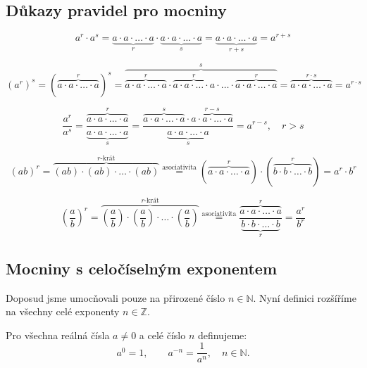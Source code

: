 \documentclass[12pt,a4paper]{article}
\begin{document}
\subsection*{Důkazy pravidel pro mocniny}

\[
a^r \cdot a^s = 
\underbrace{a \cdot a \cdot \ldots \cdot a}_{r}
\cdot
\underbrace{a \cdot a \cdot \ldots \cdot a}_{s}
=
\underbrace{a \cdot a \cdot \ldots \cdot a}_{r+s}
= a^{r+s}
\]

\[
(a^r)^s 
=
\left(\overbrace{a \cdot a \cdot \ldots \cdot a}^{r}\right)^s
=
\overbrace{\overbrace{a \cdot a \cdot \ldots \cdot a}^{r}
\cdot
\overbrace{a \cdot a \cdot \ldots \cdot a}^{r}
\cdot
\ldots
\cdot
\overbrace{a \cdot a \cdot \ldots \cdot a}^{r}}^{s}
= \overbrace{a \cdot a \cdot \ldots \cdot a}^{r \cdot s} = a^{r \cdot s}
\]

\[
\frac{a^r}{a^s} =
\frac{\overbrace{a \cdot a \cdot \ldots \cdot a}^{r}}
     {\underbrace{a \cdot a \cdot \ldots \cdot a}_{s}}
= 
\frac{\overbrace{a \cdot a \cdot \ldots \cdot a}^{s}
      \cdot \overbrace{a \cdot a \cdot \ldots \cdot a}^{r-s}}
     {\underbrace{a \cdot a \cdot \ldots \cdot a}_{s}}
= a^{r-s}, \quad r>s
\]

\[
(ab)^r = \overbrace{(ab)\cdot (ab)\cdot \ldots \cdot (ab)}^{r\text{-krát}}
\overset{\text{asociativita}}{=}
\left(\overbrace{a \cdot a \cdot \ldots \cdot a}^{r}\right)
\cdot
\left(\overbrace{b \cdot b \cdot \ldots \cdot b}^{r}\right)
= a^r \cdot b^r
\]

\[
\left(\frac{a}{b}\right)^r =
\overbrace{\left(\frac{a}{b}\right)\cdot \left(\frac{a}{b}\right)\cdot \ldots \cdot \left(\frac{a}{b}\right)}^{r\text{-krát}}
\overset{\text{asociativita}}{=}
\frac{\overbrace{a \cdot a \cdot \ldots \cdot a}^{r}}
     {\underbrace{b \cdot b \cdot \ldots \cdot b}_{r}}
= \frac{a^r}{b^r}
\]


\subsection{Mocniny s celočíselným exponentem}

Doposud jsme umocňovali pouze na přirozené číslo $n \in \mathbb{N}$. 
Nyní definici rozšíříme na všechny celé exponenty $n \in \mathbb{Z}$.

\begin{definitionbox}
Pro všechna reálná čísla $a \neq 0$ a celé číslo $n$ definujeme:
\[
a^0 = 1, \qquad 
a^{-n} = \frac{1}{a^n}, \quad n \in \mathbb{N}.
\]
\end{definitionbox}
\end{document}
